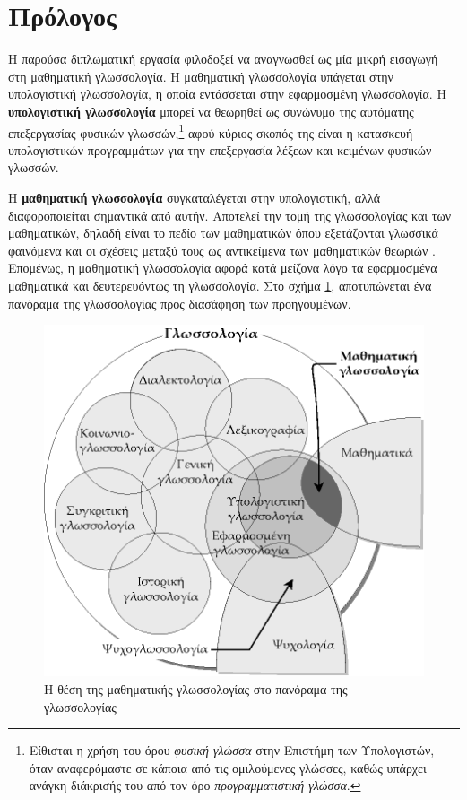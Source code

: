 \documentclass [a4paper,11pt] {book}
\theoremstyle{definition}
\theoremstyle{definition}
\begin{document}
\chapter*{Πρόλογος}
Η παρούσα διπλωματική εργασία φιλοδοξεί να αναγνωσθεί ως μία μικρή εισαγωγή στη μαθηματική γλωσσολογία. Η μαθηματική γλωσσολογία υπάγεται στην υπολογιστική γλωσσολογία, η οποία εντάσσεται στην εφαρμοσμένη γλωσσολογία. Η \textbf{υπολογιστική γλωσσολογία} μπορεί να θεωρηθεί ως συνώνυμο της αυτόματης επεξεργασίας φυσικών γλωσσών,\footnote{Είθισται η χρήση του όρου \textit{φυσική γλώσσα} στην Επιστήμη των Υπολογιστών, όταν αναφερόμαστε σε κάποια από τις ομιλούμενες γλώσσες, καθώς υπάρχει ανάγκη διάκρισής του από τον όρο \textit{προγραμματιστική γλώσσα}.} αφού κύριος σκοπός της είναι η κατασκευή υπολογιστικών προγραμμάτων για την επεξεργασία λέξεων και κειμένων φυσικών γλωσσών.

Η \textbf{μαθηματική γλωσσολογία} συγκαταλέγεται στην υπολογιστική, αλλά διαφοροποιείται σημαντικά από αυτήν. Αποτελεί την τομή της γλωσσολογίας και των μαθηματικών, δηλαδή είναι το πεδίο των μαθηματικών όπου εξετάζονται γλωσσικά φαινόμενα και οι σχέσεις μεταξύ τους ως αντικείμενα των μαθηματικών θεωριών \citep{bolshakov2004computational}. Επομένως, η μαθηματική γλωσσολογία αφορά κατά μείζονα λόγο τα εφαρμοσμένα μαθηματικά και δευτερευόντως τη γλωσσολογία. Στο σχήμα \ref{panorama}, αποτυπώνεται ένα πανόραμα της γλωσσολογίας προς διασάφηση των προηγουμένων.

\begin{figure}[ht]
\begin{center}
\includegraphics[scale=1]{glossologia.eps}
\caption{Η θέση της μαθηματικής γλωσσολογίας στο πανόραμα της γλωσσολογίας}
\label{panorama}
\end{center}
\end{figure}
\end{document}
